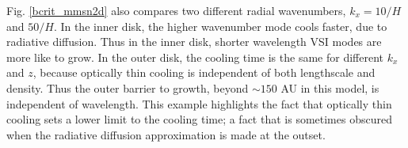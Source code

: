 \documentclass[iop, numberedappendix]{emulateapj}
\begin{document}
  Fig. \ref{bcrit_mmsn2d} also compares two different radial wavenumbers, 
  $k_x = 10/H$ and $50/H$.  In the inner disk, the higher wavenumber mode cools faster, due to radiative diffusion.
  Thus in the inner disk, shorter wavelength VSI modes are more like to grow. In the outer disk, the cooling time is the 
  same for different $k_x$ and $z$, because optically thin cooling is independent of both lengthscale and density.
  Thus the outer barrier to growth, beyond $\sim 150$ AU in this model, is independent of  wavelength. 
This example highlights the fact that optically thin cooling sets a lower limit to the cooling time; a fact that is sometimes obscured when 
the radiative diffusion approximation is made at the outset.  
 
 
% 
%
\end{document}
